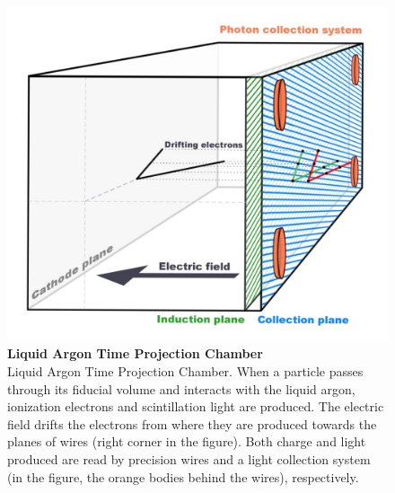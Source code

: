 \begin{figure}[h!]
	\begin{center}
		\includegraphics[scale=0.1]{Figures/LARTPC.jpg}
		\caption[LArTPC]{ {\textbf{Liquid Argon Time Projection Chamber}} \\ Liquid Argon Time Projection Chamber. When a particle passes through its fiducial volume and interacts with the liquid argon, ionization electrons and scintillation light are produced. The electric field drifts the electrons from where they are produced towards the planes of wires (right corner in the figure). Both charge and light produced are read by precision wires and a light collection system (in the figure, the orange bodies behind the wires), respectively.}
		\label{lartpc}	
	\end{center}
\end{figure}


